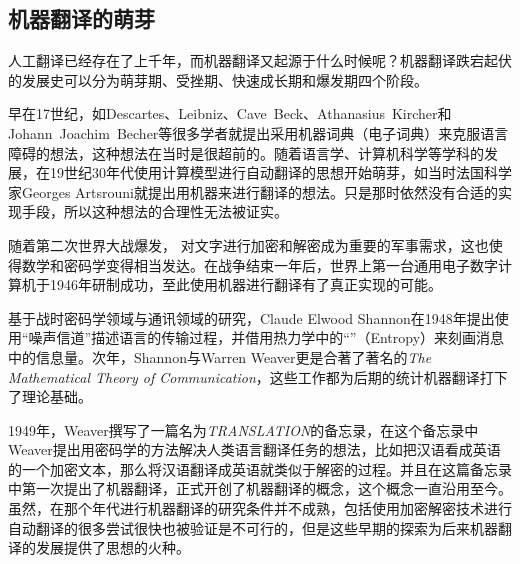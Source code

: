 
\subsection{机器翻译的萌芽}

\parinterval 人工翻译已经存在了上千年，而机器翻译又起源于什么时候呢？机器翻译跌宕起伏的发展史可以分为萌芽期、受挫期、快速成长期和爆发期四个阶段。

\parinterval 早在17世纪，如Descartes、Leibniz、Cave\ Beck、Athanasius\ Kircher和Johann\ Joachim\ Becher等很多学者就提出采用机器词典（电子词典）来克服语言障碍的想法，这种想法在当时是很超前的。随着语言学、计算机科学等学科的发展，在19世纪30年代使用计算模型进行自动翻译的思想开始萌芽，如当时法国科学家Georges Artsrouni就提出用机器来进行翻译的想法。只是那时依然没有合适的实现手段，所以这种想法的合理性无法被证实。

\parinterval 随着第二次世界大战爆发， 对文字进行加密和解密成为重要的军事需求，这也使得数学和密码学变得相当发达。在战争结束一年后，世界上第一台通用电子数字计算机于1946年研制成功，至此使用机器进行翻译有了真正实现的可能。

\parinterval 基于战时密码学领域与通讯领域的研究，Claude Elwood Shannon在1948年提出使用“噪声信道”描述语言的传输过程，并借用热力学中的“{\small{}}”（Entropy）来刻画消息中的信息量。次年，Shannon与Warren Weaver更是合著了著名的\emph{The Mathematical Theory of Communication}，这些工作都为后期的统计机器翻译打下了理论基础。

\parinterval 1949年，Weaver撰写了一篇名为\emph{TRANSLATION}的备忘录，在这个备忘录中Weaver提出用密码学的方法解决人类语言翻译任务的想法，比如把汉语看成英语的一个加密文本，那么将汉语翻译成英语就类似于解密的过程。并且在这篇备忘录中第一次提出了机器翻译，正式开创了机器翻译的概念，这个概念一直沿用至今。虽然，在那个年代进行机器翻译的研究条件并不成熟，包括使用加密解密技术进行自动翻译的很多尝试很快也被验证是不可行的，但是这些早期的探索为后来机器翻译的发展提供了思想的火种。


